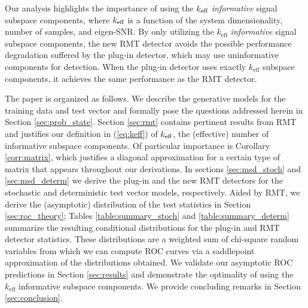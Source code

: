 Our analysis highlights the importance of using the $k_\text{eff}$ \textit{informative} signal subspace components, where $k_\text{eff}$ is a function of the system dimensionality, number of samples, and eigen-SNR. By only utilizing the $k_\text{eff}$ \textit{informative} signal subspace components, the new RMT detector avoids the possible performance degradation suffered by the plug-in detector, which may use uninformative components for detection. When the plug-in detector uses exactly $k_\text{eff}$ subspace components, it achieves the same performance as the RMT detector.



The paper is organized as follows. We describe the generative models for the training data and test vector and formally pose the questions addressed herein in Section \ref{sec:prob_state}. Section \ref{sec:rmt} contains pertinent results from RMT and justifies our definition in (\ref{eq:keff}) of $k_\text{eff}$, the (effective) number of informative subspace components. Of particular importance is Corollary \ref{corr:matrix}, which justifies a diagonal approximation for a certain type of matrix that appears throughout our derivations. In sections \ref{sec:msd_stoch} and \ref{sec:msd_determ} we derive the plug-in and the new RMT detectors for the stochastic and deterministic test vector models, respectively. Aided by RMT, we derive the (asymptotic) distribution of the test statistics in Section \ref{sec:roc_theory}; Tables \ref{table:summary_stoch} and \ref{table:summary_determ} summarize the resulting conditional distributions for the plug-in and RMT detector statistics. These distributions are a weighted sum of chi-square random variables from which we can compute ROC curves via a saddlepoint approximation of the distributions obtained. We validate our asymptotic ROC predictions in Section \ref{sec:results} and demonstrate the optimality of using the $k_\text{eff}$ informative subspace components. We provide concluding remarks in Section \ref{sec:conclusion}.
